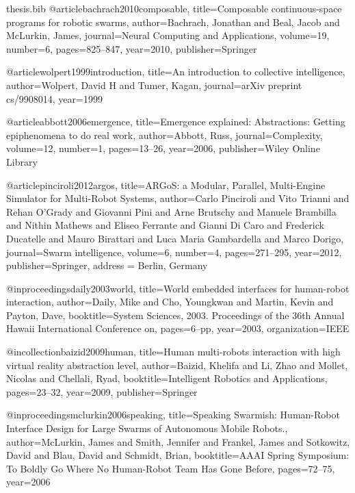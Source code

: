 \documentclass[a4paper, 12pt]{report}
\begin{document}
\begin{filecontents}{thesis.bib}
@article{bachrach2010composable,
  title={Composable continuous-space programs for robotic swarms},
  author={Bachrach, Jonathan and Beal, Jacob and McLurkin, James},
  journal={Neural Computing and Applications},
  volume={19},
  number={6},
  pages={825--847},
  year={2010},
  publisher={Springer}
}

@article{wolpert1999introduction,
  title={An introduction to collective intelligence},
  author={Wolpert, David H and Tumer, Kagan},
  journal={arXiv preprint cs/9908014},
  year={1999}
}

@article{abbott2006emergence,
  title={Emergence explained: Abstractions: Getting epiphenomena to do real work},
  author={Abbott, Russ},
  journal={Complexity},
  volume={12},
  number={1},
  pages={13--26},
  year={2006},
  publisher={Wiley Online Library}
}

@article{pinciroli2012argos,
  title={{ARGoS}: a Modular, Parallel, Multi-Engine Simulator for Multi-Robot Systems},
  author={Carlo Pinciroli and Vito Trianni and Rehan O'Grady and Giovanni Pini and Arne Brutschy and Manuele Brambilla and Nithin Mathews and Eliseo Ferrante and Gianni {Di Caro} and Frederick Ducatelle and Mauro Birattari and Luca Maria Gambardella and Marco Dorigo},
  journal={Swarm intelligence},
  volume={6},
  number={4},
  pages={271--295},
  year={2012},
  publisher={Springer},
  address = {Berlin, Germany}
}

@inproceedings{daily2003world,
  title={World embedded interfaces for human-robot interaction},
  author={Daily, Mike and Cho, Youngkwan and Martin, Kevin and Payton, Dave},
  booktitle={System Sciences, 2003. Proceedings of the 36th Annual Hawaii International Conference on},
  pages={6--pp},
  year={2003},
  organization={IEEE}
}

@incollection{baizid2009human,
  title={Human multi-robots interaction with high virtual reality abstraction level},
  author={Baizid, Khelifa and Li, Zhao and Mollet, Nicolas and Chellali, Ryad},
  booktitle={Intelligent Robotics and Applications},
  pages={23--32},
  year={2009},
  publisher={Springer}
}

@inproceedings{mclurkin2006speaking,
  title={Speaking Swarmish: Human-Robot Interface Design for Large Swarms of Autonomous Mobile Robots.},
  author={McLurkin, James and Smith, Jennifer and Frankel, James and Sotkowitz, David and Blau, David and Schmidt, Brian},
  booktitle={AAAI Spring Symposium: To Boldly Go Where No Human-Robot Team Has Gone Before},
  pages={72--75},
  year={2006}
}


\end{filecontents}

\nocite{*}


\end{document}
